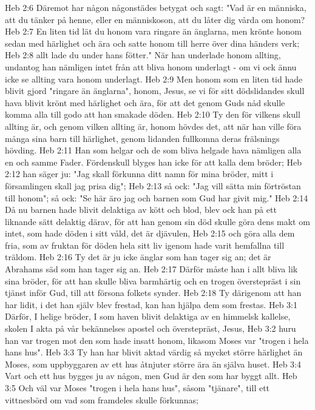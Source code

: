 Heb 2:6  Däremot har någon någonstädes betygat och sagt: "Vad är en människa, att du tänker på henne, eller en människoson, att du låter dig vårda om honom?
Heb 2:7  En liten tid lät du honom vara ringare än änglarna, men krönte honom sedan med härlighet och ära och satte honom till herre över dina händers verk;
Heb 2:8  allt lade du under hans fötter." När han underlade honom allting, undantog han nämligen intet från att bliva honom underlagt - om vi ock ännu icke se allting vara honom underlagt.
Heb 2:9  Men honom som en liten tid hade blivit gjord "ringare än änglarna", honom, Jesus, se vi för sitt dödslidandes skull hava blivit krönt med härlighet och ära, för att det genom Guds nåd skulle komma alla till godo att han smakade döden.
Heb 2:10  Ty den för vilkens skull allting är, och genom vilken allting är, honom hövdes det, att när han ville föra många sina barn till härlighet, genom lidanden fullkomna deras frälsnings hövding.
Heb 2:11  Han som helgar och de som bliva helgade hava nämligen alla en och samme Fader. Fördenskull blyges han icke för att kalla dem bröder;
Heb 2:12  han säger ju: "Jag skall förkunna ditt namn för mina bröder, mitt i församlingen skall jag prisa dig";
Heb 2:13  så ock: "Jag vill sätta min förtröstan till honom"; så ock: "Se här äro jag och barnen som Gud har givit mig."
Heb 2:14  Då nu barnen hade blivit delaktiga av kött och blod, blev ock han på ett liknande sätt delaktig därav, för att han genom sin död skulle göra dens makt om intet, som hade döden i sitt våld, det är djävulen,
Heb 2:15  och göra alla dem fria, som av fruktan för döden hela sitt liv igenom hade varit hemfallna till träldom.
Heb 2:16  Ty det är ju icke änglar som han tager sig an; det är Abrahams säd som han tager sig an.
Heb 2:17  Därför måste han i allt bliva lik sina bröder, för att han skulle bliva barmhärtig och en trogen överstepräst i sin tjänst inför Gud, till att försona folkets synder.
Heb 2:18  Ty därigenom att han har lidit, i det han själv blev frestad, kan han hjälpa dem som frestas.
Heb 3:1  Därför, I helige bröder, I som haven blivit delaktiga av en himmelsk kallelse, skolen I akta på vår bekännelses apostel och överstepräst, Jesus,
Heb 3:2  huru han var trogen mot den som hade insatt honom, likasom Moses var "trogen i hela hans hus".
Heb 3:3  Ty han har blivit aktad värdig så mycket större härlighet än Moses, som uppbyggaren av ett hus åtnjuter större ära än själva huset.
Heb 3:4  Vart och ett hus bygges ju av någon, men Gud är den som har byggt allt.
Heb 3:5  Och väl var Moses "trogen i hela hans hus", såsom "tjänare", till ett vittnesbörd om vad som framdeles skulle förkunnas;
